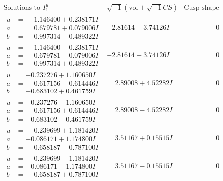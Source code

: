\documentclass[1p]{elsarticle_modified}
\theoremstyle{definition}
\newcommand{\I}{\sqrt{-1}}
\begin{document}
$$\begin{array}{c|c|c}
\text{Solutions to }I^u_{1}& \I (\text{vol} + \sqrt{-1}CS) & \text{Cusp shape}\\
 \hline 
\begin{aligned}
u &= \phantom{-}1.146400 + 0.238171 I \\
a &= \phantom{-}0.679781 + 0.079006 I \\
b &= \phantom{-}0.997314 - 0.489322 I\end{aligned}
 & -2.81614 + 3.74126 I & \phantom{-0.000000 } 0 \\ \hline\begin{aligned}
u &= \phantom{-}1.146400 - 0.238171 I \\
a &= \phantom{-}0.679781 - 0.079006 I \\
b &= \phantom{-}0.997314 + 0.489322 I\end{aligned}
 & -2.81614 - 3.74126 I & \phantom{-0.000000 } 0 \\ \hline\begin{aligned}
u &= -0.237276 + 1.160650 I \\
a &= \phantom{-}0.617156 - 0.614446 I \\
b &= -0.683102 + 0.461759 I\end{aligned}
 & \phantom{-}2.89008 + 4.52282 I & \phantom{-0.000000 } 0 \\ \hline\begin{aligned}
u &= -0.237276 - 1.160650 I \\
a &= \phantom{-}0.617156 + 0.614446 I \\
b &= -0.683102 - 0.461759 I\end{aligned}
 & \phantom{-}2.89008 - 4.52282 I & \phantom{-0.000000 } 0 \\ \hline\begin{aligned}
u &= \phantom{-}0.239699 + 1.181420 I \\
a &= -0.086171 + 1.174800 I \\
b &= \phantom{-}0.658187 - 0.787100 I\end{aligned}
 & \phantom{-}3.51167 + 0.15515 I & \phantom{-0.000000 } 0 \\ \hline\begin{aligned}
u &= \phantom{-}0.239699 - 1.181420 I \\
a &= -0.086171 - 1.174800 I \\
b &= \phantom{-}0.658187 + 0.787100 I\end{aligned}
 & \phantom{-}3.51167 - 0.15515 I & \phantom{-0.000000 } 0 \\ \hline\begin{aligned}

\end{aligned}
\end{array}$$
\end{document}
